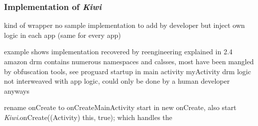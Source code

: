 \subsubsection{Implementation of \textit{Kiwi}} \label{section:license-amazon-implementation}
kind of wrapper
no sample implementation to add by developer but inject own logic in each app (same for every app)

example shows implementation recovered by reengineering explained in 2.4
amazon drm contains numerous namespaces and calsses, most have been mangled by obfuscation tools, see proguard
startup in main activity myActivity
drm logic not interweaved with app logic, could only be done by a human developer anyways\cite{munteanLicense}
%




rename onCreate to onCreateMainActivity
start in new onCreate, also start \textit{Kiwi}.onCreate((Activity) this, true); which handles the
